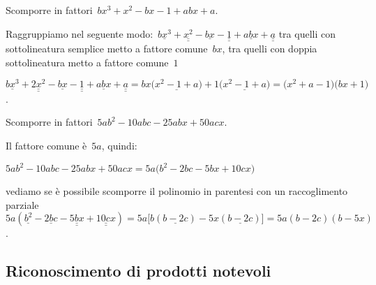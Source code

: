  \begin{esempio}
Scomporre in fattori~$bx^{3}+x^{2}-bx-1+abx+a$.
 \begin{enumeratea}
  \item Raggruppiamo nel seguente 
   modo:~$\underline{bx^{3}}+\underline{\underline {x^{2}}}-\underline{bx}-
          \underline{\underline{1}}+\underline{abx}+\underline{\underline{a}}$ 
   tra quelli con sottolineatura semplice metto a fattore comune~$bx$, 
   tra quelli con doppia sottolineatura metto a fattore comune~$1$
  \item
   $\underline{bx^{3}}+\underline{\underline {2x^{2}}}-\underline{bx}-
    \underline{\underline{1}}+\underline{abx}+\underline{\underline{a}}=
    bx\bigl(\underline{x^{2}-1+a}\bigr)+1\bigl(\underline{x^{2}-1+a}\bigr)=
    \bigl(x^{2}+a-1\bigr)\bigl(bx+1\bigr)$.
 \end{enumeratea}
 \end{esempio}

 \begin{esempio}
Scomporre in fattori~$5ab^{2}-10abc-25abx+50acx$.
 \begin{enumeratea}
  \item Il fattore comune è~$5a$, quindi:
    \begin{itemize*}
    \item $5ab^{2}-10abc-25abx+50acx=5a\bigl(b^{2}-2bc-5bx+10cx\bigr)$
    \end{itemize*}
  \item vediamo se è possibile scomporre il polinomio in parentesi con un 
   raccoglimento parziale~$5a(\underline{b^{2}}-\underline{2bc}
     -\underline{\underline{5bx}}+\underline{\underline{10cx}})=
     5a\bigl[b(\underline{b-2c})-5x(\underline{b-2c})\bigr]=5a(b-2c)(b-5x)$.
 \end{enumeratea}
 \end{esempio}

% 


\subsection{Riconoscimento di prodotti notevoli}
\label{subsec:divpol_prodnot}

